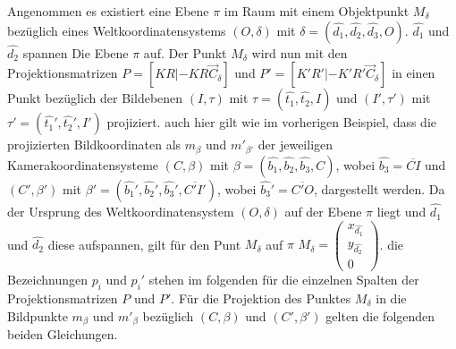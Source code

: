 Angenommen es existiert eine Ebene $\pi$ im Raum mit einem Objektpunkt $M_\delta$ bezüglich eines Weltkoordinatensystems $(O,\delta)$ mit $\delta = (\hat{d_1},\hat{d_2},\hat{d_3},O)$. $\hat{d_1}$ und $\hat{d_2}$ spannen Die Ebene $\pi$ auf. Der Punkt $M_\delta$ wird nun mit den Projektionsmatrizen $P = [KR|-KR\vec{C}_\delta]$ und $P'=	[K'R'|-K'R'\vec{C}_\delta]$ in einen Punkt bezüglich der Bildebenen $(I,\tau)$ mit $\tau = (\hat{t_1}, \hat{t_2},I)$ und $(I',\tau')$ mit $\tau' = (\hat{t_1}', \hat{t_2}',I')$ projiziert. auch hier gilt wie im vorherigen Beispiel, dass die projizierten Bildkoordinaten als $m_\beta$ und $m'_{\beta'}$ der jeweiligen Kamerakoordinatensysteme $(C,\beta)$ mit $\beta = (\hat{b_1},\hat{b_2},\hat{b_3},C)$, wobei $\hat{b_3} = \overline{CI}$ und $(C',\beta')$ mit $\beta' = (\hat{b_1}',\hat{b_2}',\hat{b_3}',\overline{C'I'})$, wobei $\hat{b_3}' = \overline{C'O}$, dargestellt werden. Da der Ursprung des Weltkoordinatensystem $(O,\delta)$ auf der Ebene $\pi$ liegt und $\hat{d_1}$ und $\hat{d_2}$ diese aufspannen, gilt für den Punt $M_\delta$ auf $\pi$ $M_\delta = \begin{pmatrix}
x_{\hat{d_1}}\\
y_{\hat{d_2}}\\
0
\end{pmatrix}$. die Bezeichnungen $p_i$ und $p_i'$ stehen im folgenden für die einzelnen Spalten der Projektionsmatrizen $P$ und $P'$. Für die Projektion des Punktes $M_\delta$ in die Bildpunkte  $m_\beta$ und $m'_{\beta}$ bezüglich $(C,\beta)$ und $(C',\beta')$ gelten die folgenden beiden Gleichungen\cite{Elements}.


